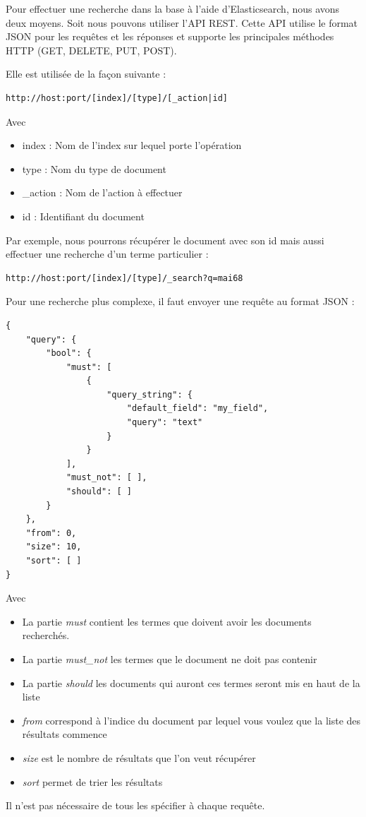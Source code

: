 Pour effectuer une recherche dans la base à l’aide d’Elasticsearch, nous avons deux moyens. Soit nous pouvons utiliser l’API REST. Cette API utilise le format JSON pour les requêtes et les réponses et supporte les principales méthodes HTTP (GET, DELETE, PUT, POST). 


Elle est utilisée de la façon suivante :
\begin{verbatim}
http://host:port/[index]/[type]/[_action|id]
\end{verbatim}
Avec

\begin{itemize}
	\item index : Nom de l’index sur lequel porte l’opération
	\item type : Nom du type de document
	\item \_action : Nom de l’action à effectuer
	\item id : Identifiant du document
\end{itemize}


Par exemple, nous pourrons récupérer le document avec son id mais aussi effectuer une recherche d’un terme particulier :
\begin{verbatim}
http://host:port/[index]/[type]/_search?q=mai68
\end{verbatim}

Pour une recherche plus complexe, il faut envoyer une requête au format JSON :

\begin{verbatim}
{
    "query": {
        "bool": {
            "must": [
                {
                    "query_string": {
                        "default_field": "my_field",
                        "query": "text"
                    }
                }
            ],
            "must_not": [ ],
            "should": [ ]
        }
    },
    "from": 0,
    "size": 10,
    "sort": [ ]
}
\end{verbatim}

Avec
\begin{itemize}
	\item La partie \textit{must} contient les termes que doivent avoir les documents recherchés.
	\item La partie \textit{must\_not} les termes que le document ne doit pas contenir
	\item La partie \textit{should} les documents qui auront ces termes seront mis en haut de la liste
	\item \textit{from} correspond à l'indice du document par lequel vous voulez que la liste des résultats commence
	\item \textit {size} est le nombre de résultats que l'on veut récupérer
	\item \textit{sort} permet de trier les résultats
\end{itemize}
Il n'est pas nécessaire de tous les spécifier à chaque requête.


